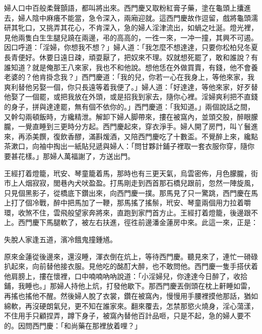 婦人口中百般柔聲顫語，都叫將出來。{}西門慶又取粉紅膏子藥，塗在龜頭上攮進去，婦人陰中麻癢不能當，急令深入，兩廂迎就。這西門慶故作逗留，戲將龜頭濡研其牝口，又挑弄其花心，不肯深入，急的婦人淫津流出，如蝸之吐涎。燈光裡，見他兩隻白生生腿兒蹺在兩邊，弔的高高的，一徃一來，一冲一撞，其興不可遏。因口呼道：「淫婦，你想我不想？」婦人道：「我怎麼不想達達，只要你松柏兒冬夏長青便好。休要日遠日疎，頑耍厭了，把奴來不理。奴就想死罷了，敢和誰說？有誰知道？就是俺那王八來家，我也不和他說。想他恁在外做買賣，有錢，他不會養老婆的？他肯掛念我？」西門慶道：「我的兒，你若一心在我身上，等他來家，我爽利替他另娶一個，你只長遠等着我便了。」婦人道：「好達達，等他來家，好歹替他娶了一個罷，或把我放在外頭，或是招我到家去，隨你心裡。淫婦爽利把不直錢的身子，拼與達達罷，無有個不依你的。」{}西門慶道：「我知道。」兩個說話之間，又幹勾兩頓飯時，方纔精泄。解卸下婦人脚帶來，摟在被窩內，並頭交股，醉眼朦朧，一覺直睡到三更時分方起。西門慶起來，穿衣淨手。婦人開了房門，叫丫鬟進來，再添美饌，復飲香醪，滿斟煖酒，又陪西門慶吃了十數盃。不覺醉上來，纔點茶漱口，向袖中掏出一紙貼兒遞與婦人：「問甘夥計鋪子裡取一套衣服你穿，隨你要甚花樣。」那婦人萬福謝了，方送出門。

王經打着燈籠，玳安、琴童籠着馬，那時也有三更天氣，烏雲密佈，月色朦朧，街市上人烟寂寂，閭巷內犬吠盈盈。打馬剛走到西首那石橋兒跟前，忽然一陣旋風，只見個黑影子，從橋底下鑽出來，向西門慶一撲。{}那馬見了只一驚跳，西門慶在馬上打了個冷戰，醉中把馬加了一鞭，那馬搖了搖鬃，玳安、琴童兩個用力拉着嚼環，收煞不住，雲飛般望家奔將來，直跑到家門首方止。王經打着燈籠，後邊跟不上。西門慶下馬腿軟了，被左右扶進，徑徃前邊潘金蓮房中來。{}此這一來，正是：

\begin{myquote} 
失脫人家逢五道，濱冷餓鬼撞鍾馗。
\end{myquote} 

原來金蓮從後邊來，還沒睡，渾衣倒在炕上，等待西門慶。聽見來了，連忙一磆碌扒起來，向前替他接衣服。見他吃的酩酊大醉，也不敢問他。西門慶一隻手搭伏着他肩膀上，摟在懷裡，口中喃喃吶吶說道：「小淫婦兒，你達達今日醉了，收拾鋪，我睡也。」那婦人持他上炕，打發他歇下。那西門慶丟倒頭在枕上鼾睡如雷，再搖也搖他不醒。然後婦人脫了衣裳，鑽在被窩內，慢慢用手腰裡摸他那話，猶如綿軟，再沒硬朗氣兒，更不知在誰家來。翻來覆去，怎禁那慾火燒身，淫心蕩漾，不住用手只顧捏弄，蹲下身子，被窩內替他百計品咂，只是不起，急的婦人要不的。因問西門慶：「和尚藥在那裡放着哩？」

